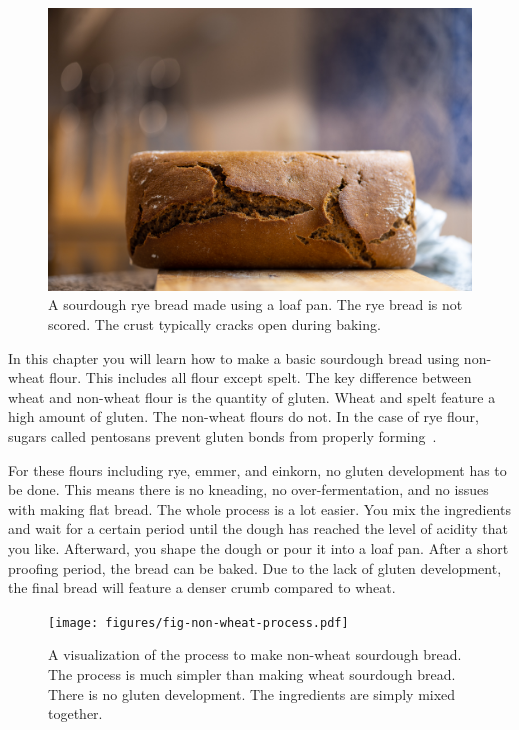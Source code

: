 \begin{figure}[!htb]
  \includegraphics[width=\textwidth]{final-bread}
  \caption{A sourdough rye bread made using a loaf pan. The
  rye bread is not scored. The crust typically cracks
  open during baking.}
  \label{fig:non-wheat-final-bread}
\end{figure}

In this chapter you will learn how to make a basic sourdough bread
using non-wheat flour. This includes all flour except spelt.
The key difference between wheat and non-wheat flour is
the quantity of gluten. Wheat and spelt feature a high amount
of gluten. The non-wheat flours do not. In the case of rye flour,
sugars called pentosans prevent gluten bonds from properly
forming~\cite{rye+pentosans}.

For these flours including rye, emmer, and einkorn, no gluten
development has to be done. This means there is no kneading,
no over-fermentation, and no issues with making flat bread.
The whole process
is a lot easier. You mix the ingredients and
wait for a certain period until the dough has
reached the level of acidity that you like. Afterward, you
shape the dough or pour it into a loaf pan. After a short proofing
period, the bread can be baked. Due to the lack
of gluten development, the final bread will feature a denser
crumb compared to wheat.

\begin{figure}[!htb]
  \texttt{[image: figures/fig-non-wheat-process.pdf]}
  \caption{A visualization of the process to make non-wheat sourdough bread.
  The process is much simpler than making wheat sourdough bread. There is
  no gluten development. The ingredients are simply mixed together.}
  \label{fig:non-wheat-sourdough}
\end{figure}

